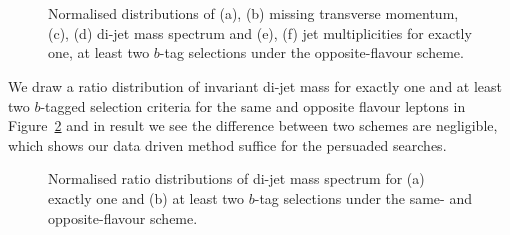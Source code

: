 \documentclass[a4paper]{jpconf}
\begin{document}
\begin{figure}[!htbp]
	\centering
	 \\
	 \\
	\caption{Normalised distributions of (a), (b) missing transverse momentum, (c), (d) di-jet mass spectrum and (e), (f) jet multiplicities 
	for exactly one, at least two $b$-tag selections under the opposite-flavour scheme.}
	\label{fig:b}
\end{figure}
We draw a ratio distribution of invariant di-jet mass for exactly one and at least two $b$-tagged selection criteria for the same and 
opposite flavour leptons in Figure~\ref{fig:c} and in result we see the difference between two schemes are negligible, which shows our data driven method
suffice for the persuaded searches. 
\begin{figure}[!htbp]
	\centering
	\caption{Normalised ratio distributions of di-jet mass spectrum  
	for (a) exactly one and (b) at least two $b$-tag selections under the same- and opposite-flavour scheme.}
	\label{fig:c}
\end{figure}
\end{document}
